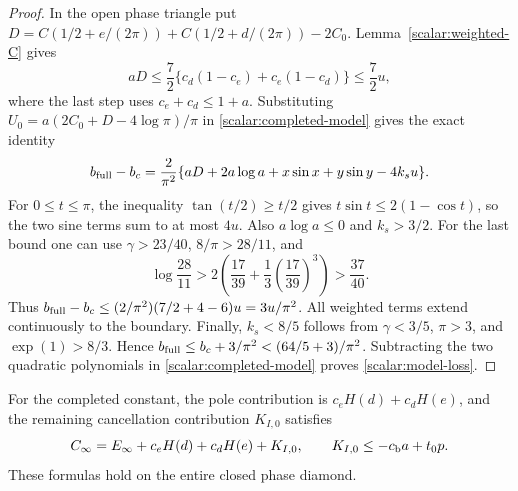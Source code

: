 \begin{proof}
In the open phase triangle put
$D=C(1/2+e/(2\pi))+C(1/2+d/(2\pi))-2C_0$.
Lemma~\ref{scalar:weighted-C} gives
\[
 aD\leq\frac72\{c_d(1-c_e)+c_e(1-c_d)\}
 \leq\frac72u,
\]
where the last step uses $c_e+c_d\leq1+a$.
Substituting $U_0=a(2C_0+D-4\log\pi)/\pi$ in
\eqref{scalar:completed-model} gives the exact identity
\[
 b_{\rm full}-b_c=\frac2{\pi^2}
 \{aD+2a\log a+x\sin x+y\sin y-4k_su\}.
\]
For $0\leq t\leq\pi$, the inequality $\tan(t/2)\geq t/2$
gives $t\sin t\leq2(1-\cos t)$, so the two sine terms sum to at
most $4u$.  Also $a\log a\leq0$ and $k_s>3/2$.  For the last
bound one can use $\gamma>23/40$, $8/\pi>28/11$, and
\[
 \log\frac{28}{11}
 >2\left(\frac{17}{39}+\frac13\left(\frac{17}{39}\right)^3\right)
 >\frac{37}{40}.
\]
Thus $b_{\rm full}-b_c\leq(2/\pi^2)(7/2+4-6)u=3u/\pi^2$.
All weighted terms extend continuously to the boundary.  Finally,
$k_s<8/5$ follows from $\gamma<3/5$, $\pi>3$, and
$\exp(1)>8/3$.  Hence $b_{\rm full}\leq b_c+3/\pi^2
<(64/5+3)/\pi^2$.  Subtracting the two quadratic polynomials in
\eqref{scalar:completed-model} proves \eqref{scalar:model-loss}.
\end{proof}

\begin{lemma}
\label{scalar:global-cancellation}
For the completed constant, the pole contribution is
$c_eH(d)+c_dH(e)$, and the remaining cancellation contribution
$K_{I,0}$ satisfies
\begin{equation}\label{scalar:global-KI}
 C_\infty=E_\infty+c_eH(d)+c_dH(e)+K_{I,0},\qquad
 K_{I,0}\leq-c_{\rm b}a+t_0p.
\end{equation}
These formulas hold on the entire closed phase diamond.
\end{lemma}

